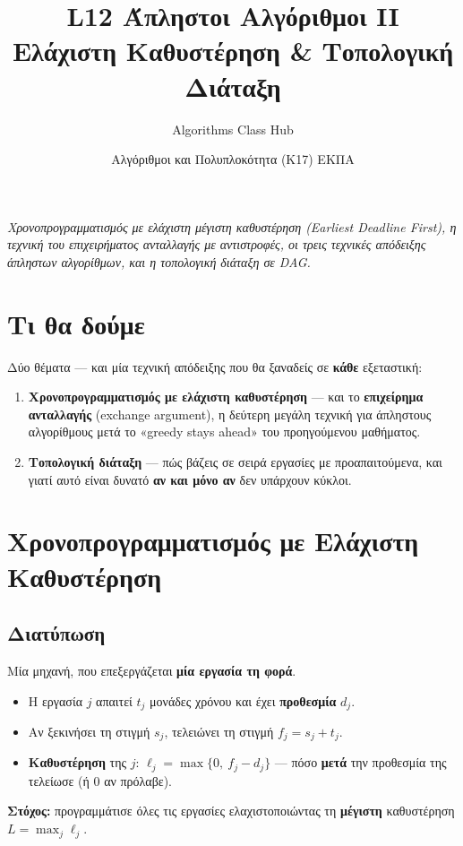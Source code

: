 \documentclass[11pt,a4paper]{article}
\title{\textbf{L12 \textperiodcentered{} Άπληστοι Αλγόριθμοι II}\\[2pt]
\large Ελάχιστη Καθυστέρηση \& Τοπολογική Διάταξη}
\author{Algorithms Class Hub}
\date{\small Αλγόριθμοι και Πολυπλοκότητα (K17) \textperiodcentered{} ΕΚΠΑ}
\begin{document}
\maketitle

\begin{center}\itshape\small
Χρονοπρογραμματισμός με ελάχιστη μέγιστη καθυστέρηση (Earliest Deadline First), η
τεχνική του επιχειρήματος ανταλλαγής με αντιστροφές, οι τρεις τεχνικές απόδειξης
άπληστων αλγορίθμων, και η τοπολογική διάταξη σε DAG.
\end{center}

\section{Τι θα δούμε}

Δύο θέματα --- και μία τεχνική απόδειξης που θα ξαναδείς σε \textbf{κάθε}
εξεταστική:
\begin{enumerate}
  \item \textbf{Χρονοπρογραμματισμός με ελάχιστη καθυστέρηση} --- και το
  \textbf{επιχείρημα ανταλλαγής} (exchange argument), η δεύτερη μεγάλη τεχνική
  για άπληστους αλγορίθμους μετά το «greedy stays ahead» του προηγούμενου
  μαθήματος.
  \item \textbf{Τοπολογική διάταξη} --- πώς βάζεις σε σειρά εργασίες με
  προαπαιτούμενα, και γιατί αυτό είναι δυνατό \textbf{αν και μόνο αν} δεν
  υπάρχουν κύκλοι.
\end{enumerate}

\section{Χρονοπρογραμματισμός με Ελάχιστη Καθυστέρηση}

\subsection{Διατύπωση}

Μία μηχανή, που επεξεργάζεται \textbf{μία εργασία τη φορά}.
\begin{itemize}
  \item Η εργασία $j$ απαιτεί $t_j$ μονάδες χρόνου και έχει \textbf{προθεσμία}
  $d_j$.
  \item Αν ξεκινήσει τη στιγμή $s_j$, τελειώνει τη στιγμή $f_j = s_j + t_j$.
  \item \textbf{Καθυστέρηση} της $j$: $\ell_j = \max\{0,\ f_j - d_j\}$ --- πόσο
  \textbf{μετά} την προθεσμία της τελείωσε (ή $0$ αν πρόλαβε).
\end{itemize}
\textbf{Στόχος:} προγραμμάτισε όλες τις εργασίες ελαχιστοποιώντας τη
\textbf{μέγιστη} καθυστέρηση $L = \max_j \ell_j$.
\end{document}

